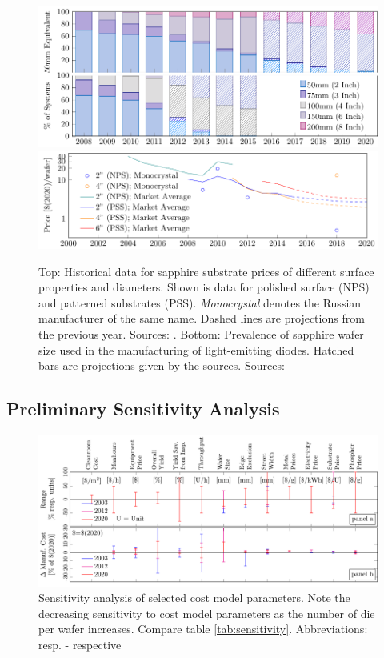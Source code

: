 \documentclass[10pt]{article}
\begin{document}
\begin{figure}[h!]
    \includegraphics[width=14.5cm]{./figures/wafer_size.pdf}
    \includegraphics[width=15cm]{./figures/sapphire_prices.pdf}
	\caption{Top: Historical data for sapphire substrate prices of different surface properties and diameters. Shown is data for polished surface (NPS) and patterned substrates (PSS). \textit{Monocrystal} denotes the Russian manufacturer of the same name. Dashed lines are projections from the previous year. Sources: \cite{monocrystal2020private}\cite{yole2011sapphire}\cite{yole2015sapphire}. Bottom: Prevalence of sapphire wafer size used in the manufacturing of light-emitting diodes. Hatched bars are projections given by the sources. Sources: \cite{veeco2013}\cite{Scholand2012}\cite{yole2015sapphire}}
	\label{fig:wafer_size}
\end{figure}

\subsection{Preliminary Sensitivity Analysis}

\begin{figure}[h]
	\centering
    \includegraphics[width=\textwidth]{2_SSL_EES/article/figures/costmodel_sensitivity.pdf}
	\caption{Sensitivity analysis of selected cost model parameters. Note the decreasing sensitivity to cost model parameters as the number of die per wafer increases. Compare table \cref{tab:sensitivity}. Abbreviations: resp. - respective}
	\label{fig:sensitivity}
\end{figure}
\end{document}
